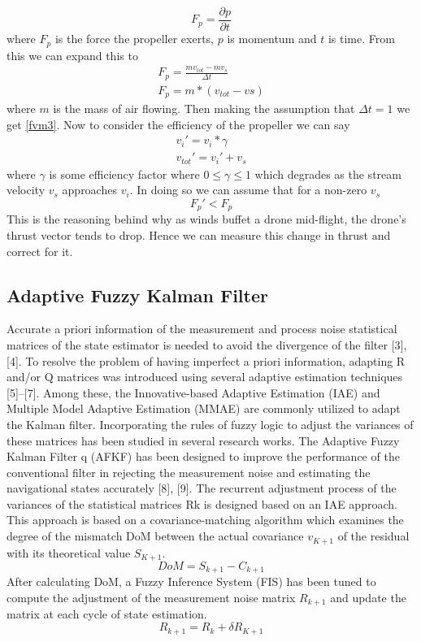 \documentclass[conference]{IEEEtran}
\begin{document}
\begin{equation}
F_p= \frac{\partial p}{\partial t}
\label{fvm}
\end{equation}
where $F_p$ is the force the propeller exerts, $p$ is momentum and $t$ is time. From this we can expand this to 
\begin{eqnarray}
F_p= \frac{mv_{tot} - mv_{s}}{\Delta t}\\ 
\label{fvm2}
F_p= m*(v_{tot}-v{s}) 
\label{fvm3}
\end{eqnarray}
where $m$ is the mass of air flowing. Then making the assumption that $\Delta t = 1$ we get \ref{fvm3}.	Now to consider the efficiency of the propeller we can say 
\begin{eqnarray}	
v_{i}\prime = v_{i}* \gamma\\
v_{tot}\prime = v_i\prime + v_s
\label{eff}
\end{eqnarray}
where $\gamma$ is some efficiency factor where $0 \leq  \gamma \leq 1$ which degrades as the stream velocity $v_s$ approaches $v_i$\cite{someone}. In doing so we can assume that for a non-zero $v_s$ 
\begin{equation}
F_p\prime < F_p
\end{equation}
This is the reasoning behind why as winds buffet a drone mid-flight, the drone's thrust vector tends to drop. Hence we can measure this change in thrust and correct for it.
\subsection{Adaptive Fuzzy Kalman Filter }

Accurate a priori information of the measurement and process noise statistical matrices of the state estimator is needed to avoid the divergence of the filter [3], [4]. To resolve the problem of having imperfect a priori information, adapting R and/or Q matrices was introduced using several adaptive estimation techniques [5]–[7]. Among these, the Innovative-based Adaptive Estimation (IAE) and Multiple Model Adaptive Estimation (MMAE) are commonly utilized to adapt the Kalman filter. Incorporating the rules of fuzzy logic to adjust the variances of these matrices has been studied in several research works. The Adaptive Fuzzy Kalman Filter q (AFKF) has been designed to improve the performance of the conventional filter in rejecting the measurement noise and estimating the navigational states accurately [8], [9]. 
The recurrent adjustment process of the variances of the statistical matrices Rk is designed based on an IAE approach. This approach is based on a covariance-matching algorithm which examines the degree of the mismatch DoM between the actual covariance $v_{K+1}$ of the residual with its theoretical value $S_{K+1}$. 
\begin{equation}
DoM = S_{k+1} - C_{k+1}
\label{dom}
\end{equation}
After calculating DoM, a Fuzzy Inference System (FIS) has been tuned to compute the adjustment of the measurement noise matrix $R_{k+1}$ and update the matrix at each cycle of state estimation.
\begin{equation}
R_{k+1} = R_k +\delta R_{K+1}
\label{rk1}
\end{equation} 
\end{document}

